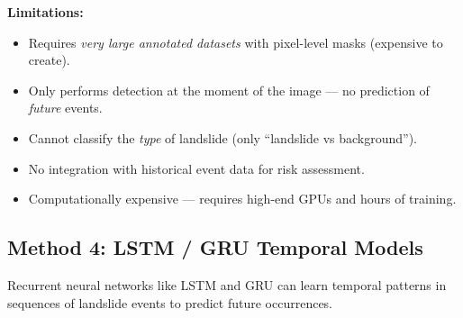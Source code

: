 \documentclass[11pt]{article}
\begin{document}
\textbf{Limitations:}
\begin{itemize}[nosep]
    \item Requires \emph{very large annotated datasets} with pixel-level masks (expensive to create).
    \item Only performs detection at the moment of the image --- no prediction of \emph{future} events.
    \item Cannot classify the \emph{type} of landslide (only ``landslide vs background'').
    \item No integration with historical event data for risk assessment.
    \item Computationally expensive --- requires high-end GPUs and hours of training.
\end{itemize}


\subsection{Method 4: LSTM / GRU Temporal Models}

Recurrent neural networks like LSTM and GRU can learn temporal patterns in sequences of landslide events to predict future occurrences.
\end{document}
